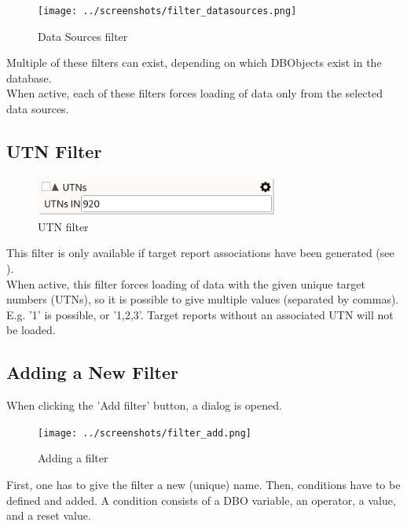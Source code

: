 \begin{figure}[H]
  \center
    \texttt{[image: ../screenshots/filter\_datasources.png]}
  \caption{Data Sources filter}
\end{figure}

Multiple of these filters can exist, depending on which DBObjects exist in the database. \\

When active, each of these filters forces loading of data only from the selected data sources. \\

\subsection{UTN Filter}

\begin{figure}[H]
  \center
    \includegraphics[width=8cm,frame]{../screenshots/filter_utn.png}
  \caption{UTN filter}
\end{figure}

This filter is only available if target report associations have been generated (see ). \\

When active, this filter forces loading of data with the given unique target numbers (UTNs), so it is possible to give multiple values (separated by commas). E.g. '1' is possible, or '1,2,3'. Target reports without an associated UTN will not be loaded. \\

\subsection{Adding a New Filter}
When clicking the 'Add filter' button, a dialog is opened.

\begin{figure}[H]
  \center
    \texttt{[image: ../screenshots/filter\_add.png]}
  \caption{Adding a filter}
  \label{fig:filter_add}
\end{figure}

First, one has to give the filter a new (unique) name. Then, conditions have to be defined and added. A condition consists of a DBO variable, an operator, a value, and a reset value. \\

